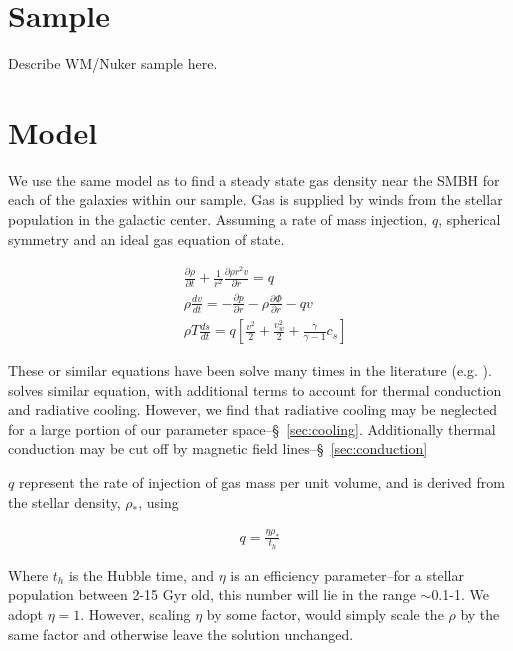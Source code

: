 \documentclass[usenatbib,fleqn]{mn2e}
\newcommand{\cs}{c_s}
\newcommand{\dxdy}[2]{\frac{\partial #1}{\partial #2} }
\newcommand{\drhodt}{\dxdy{\rho}{t}}
\newcommand{\dpdr}{\dxdy{p}{r}}
\newcommand{\dphidr}{\dxdy{\Phi}{r}}
\newcommand{\ke}{\frac{v^2}{2}}
\newcommand{\kew}{\frac{v_w^2}{2}}
\newcommand{\gammaf}{\frac{\gamma}{\gamma-1}}
\newcommand{\cs}{\frac{p}{\rho}}
\begin{document}


\section{Sample}
Describe WM/Nuker sample here.

\section{Model}
We use the same model as \citealt{Quataert:2004a} to find a steady state gas density near the SMBH for each of the galaxies within our sample.  Gas is supplied by winds from the stellar population in the galactic center. Assuming a rate of mass injection, $q$, spherical symmetry and an ideal gas equation of state. 

\begin{align}
&\drhodt+\frac{1}{r^2}\dxdy{\rho r^2 v}{r}=q\\
&\rho \frac{dv}{dt}=-\dpdr-\rho \dphidr-q v\\
&\rho T \frac{ds}{dt}=q\left[\ke+\kew+\gammaf \cs \right]
\end{align}

These or similar equations have been solve many times in the literature (e.g. \citealt{HolzerAxelford1971a,Quataert:2004a,De-ColleGuillochon+:2012a,ShcherbakovWong+:2014a}). \citealt{ShcherbakovWong+:2014a} solves similar equation, with additional terms to account for thermal conduction and radiative cooling. However, we find that radiative cooling may be neglected for a large portion of our parameter space--\S~\ref{sec:cooling}.  Additionally thermal conduction may be cut off by magnetic field lines--\S~\ref{sec:conduction}

$q$ represent the rate of injection of gas mass per unit volume, and is derived from the stellar density, $\rho_*$, using

\begin{align}
q=\frac{\eta \rho_*}{t_h}
\end{align}

Where $t_h$ is the Hubble time, and $\eta$ is an efficiency parameter--for a stellar population between 2-15 Gyr old, this 
number will lie in the range $\sim$0.1-1. We adopt $\eta=1$. However, scaling $\eta$ by some factor, would simply scale the $\rho$ by the same factor and otherwise leave the solution unchanged.
\end{document}
